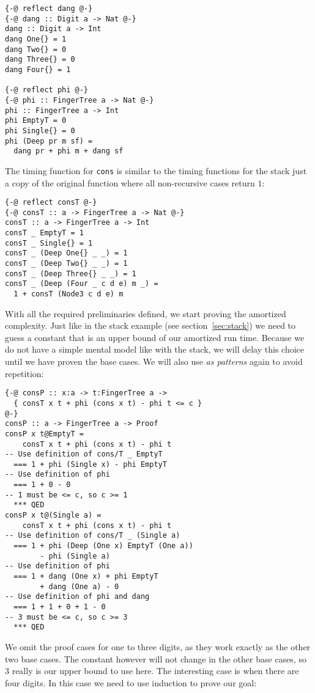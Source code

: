 \documentclass[sigplan,screen]{acmart}
\begin{document}
\begin{lstlisting}
{-@ reflect dang @-}
{-@ dang :: Digit a -> Nat @-}
dang :: Digit a -> Int
dang One{} = 1
dang Two{} = 0
dang Three{} = 0
dang Four{} = 1

{-@ reflect phi @-}
{-@ phi :: FingerTree a -> Nat @-}
phi :: FingerTree a -> Int
phi EmptyT = 0
phi Single{} = 0
phi (Deep pr m sf) =
  dang pr + phi m + dang sf
\end{lstlisting}

The timing function for \texttt{cons} is similar to the timing functions for the stack just a copy of the original function where all non-recursive cases return $1$:

\begin{lstlisting}
{-@ reflect consT @-}
{-@ consT :: a -> FingerTree a -> Nat @-}
consT :: a -> FingerTree a -> Int
consT _ EmptyT = 1
consT _ Single{} = 1
consT _ (Deep One{} _ _) = 1
consT _ (Deep Two{} _ _) = 1
consT _ (Deep Three{} _ _) = 1
consT _ (Deep (Four _ c d e) m _) =
  1 + consT (Node3 c d e) m
\end{lstlisting}

With all the required preliminaries defined, we start proving the amortized complexity. Just like in the stack example (see section~\ref{sec:stack}) we need to guess a constant that is an upper bound of our amortized run time. Because we do not have a simple mental model like with the stack, we will delay this choice until we have proven the base cases. We will also use \textit{as patterns} again to avoid repetition:

\begin{lstlisting}
{-@ consP :: x:a -> t:FingerTree a ->
  { consT x t + phi (cons x t) - phi t <= c }
@-}
consP :: a -> FingerTree a -> Proof
consP x t@EmptyT =
    consT x t + phi (cons x t) - phi t
-- Use definition of cons/T _ EmptyT
  === 1 + phi (Single x) - phi EmptyT
-- Use definition of phi
  === 1 + 0 - 0
-- 1 must be <= c, so c >= 1
  *** QED
consP x t@(Single a) =
    consT x t + phi (cons x t) - phi t
-- Use definition of cons/T _ (Single a)
  === 1 + phi (Deep (One x) EmptyT (One a))
        - phi (Single a)
-- Use definition of phi
  === 1 + dang (One x) + phi EmptyT
        + dang (One a) - 0
-- Use definition of phi and dang
  === 1 + 1 + 0 + 1 - 0
-- 3 must be <= c, so c >= 3
  *** QED
\end{lstlisting}

We omit the proof cases for one to three digits, as they work exactly as the other two base cases. The constant however will not change in the other base cases, so $3$ really is our upper bound to use here. The interesting case is when there are four digits. In this case we need to use induction to prove our goal:
\end{document}
